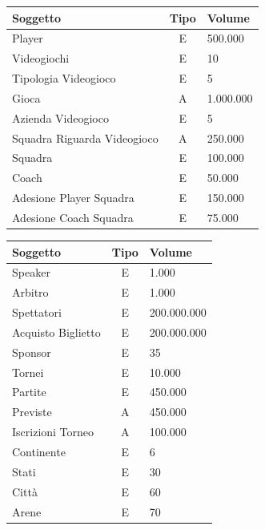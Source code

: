 \documentclass[a4paper,12pt]{report}
\begin{document}
\begin{tabular}{|m{2cm}|c|m{2cm}|}
	\hline\rowcolor{pink}
	Soggetto & Tipo & Volume\\
	\hline\hline
	
	Player & E & 500.000\\
	\hline
	Videogiochi & E & 10\\
	\hline
	Tipologia Videogioco & E & 5\\
	\hline
	Gioca & A & 1.000.000\\
	\hline
	Azienda Videogioco & E & 5\\
	\hline
	 Squadra Riguarda Videogioco & A & 250.000\\
	
	\hline
	\hline
	
	Squadra & E & 100.000\\
	\hline
	Coach & E & 50.000\\
	\hline
	Adesione Player Squadra& E & 150.000\\ 
	\hline
	Adesione Coach Squadra& E & 75.000\\ 
	
	\hline
\end{tabular}
\setlength\doublerulesep{0.28cm} %
\begin{tabular}{|m{2cm}|c|m{2cm}|}
	\hline\rowcolor{pink}
	Soggetto & Tipo & Volume\\
	\hline\hline
	Speaker & E & 1.000\\
	\hline
	Arbitro & E & 1.000\\
	\hline
	Spettatori & E & 200.000.000\\
	\hline
	Acquisto Biglietto & E & 200.000.000\\ 
	\hline
	Sponsor & E & 35\\
	
	\hline\hline
	
	Tornei & E & 10.000\\
	\hline
	Partite & E & 450.000\\
	\hline
	Previste & A & 450.000\\ 
	\hline
	Iscrizioni Torneo & A & 100.000\\ 
	\hline
	
	\hline\hline
	
	Continente & E & 6\\
	\hline
	Stati & E & 30\\
	\hline
	Città & E & 60\\ 
	\hline
	Arene & E & 70\\ 
	\hline
	
	
\end{tabular}
\end{document}
